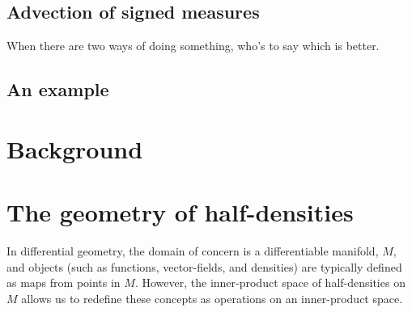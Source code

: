 \documentclass[12pt]{amsart}
\begin{document}
\subsection{Advection of signed measures}
\label{sec:signed}
When there are two ways of doing something, who's to say which is better.

\subsection{An example}

\section{Background}
\label{sec:background}

\section{The geometry of half-densities}
\label{sec:half_densities}

In differential geometry, the domain of concern is
a differentiable manifold, $M$, and objects (such as
functions, vector-fields, and densities) are typically defined
as maps from points in $M$.
However, the inner-product space
of half-densities on $M$ allows us to redefine these concepts
as operations on an inner-product space.
\end{document}
